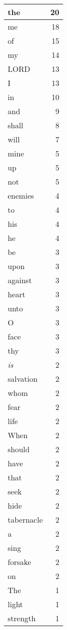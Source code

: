\begin{center}
\begin{longtable}{l|r}
\hline \hline
\endlastfoot
the & 20 \\ \hline
me & 18 \\ \hline
of & 15 \\ \hline
my & 14 \\ \hline
LORD & 13 \\ \hline
I & 13 \\ \hline
in & 10 \\ \hline
and & 9 \\ \hline
shall & 8 \\ \hline
will & 7 \\ \hline
mine & 5 \\ \hline
up & 5 \\ \hline
not & 5 \\ \hline
enemies & 4 \\ \hline
to & 4 \\ \hline
his & 4 \\ \hline
he & 4 \\ \hline
be & 3 \\ \hline
upon & 3 \\ \hline
against & 3 \\ \hline
heart & 3 \\ \hline
unto & 3 \\ \hline
O & 3 \\ \hline
face & 3 \\ \hline
thy & 3 \\ \hline
\emph{is} & 2 \\ \hline
salvation & 2 \\ \hline
whom & 2 \\ \hline
fear & 2 \\ \hline
life & 2 \\ \hline
When & 2 \\ \hline
should & 2 \\ \hline
have & 2 \\ \hline
that & 2 \\ \hline
seek & 2 \\ \hline
hide & 2 \\ \hline
tabernacle & 2 \\ \hline
a & 2 \\ \hline
sing & 2 \\ \hline
forsake & 2 \\ \hline
on & 2 \\ \hline
The & 1 \\ \hline
light & 1 \\ \hline
strength & 1 \\ \hline

\end{longtable}
\end{center}
